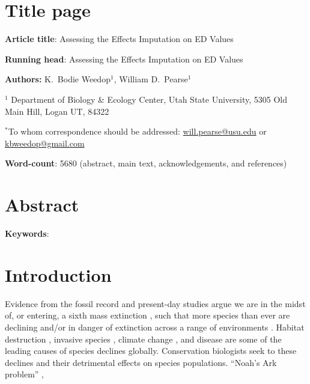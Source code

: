\documentclass[12pt,english]{article}
\begin{document}
\setlength{\parindent}{0pt}
\section*{Title page}

\textbf{Article title}: Assessing the Effects Imputation on ED Values

\textbf{Running head}: Assessing the Effects Imputation on ED Values

\textbf{Authors:} K.\ Bodie Weedop$^{1}$, William D.\ Pearse$^{1}$\

$^1$ Department of Biology \& Ecology Center, Utah State University,
5305 Old Main Hill, Logan UT, 84322

$^*$To whom correspondence should be addressed:
\url{will.pearse@usu.edu} or \url{kbweedop@gmail.com}

\textbf{Word-count}: 5680 (abstract, main text, acknowledgements, and
  references)

\clearpage
\section*{Abstract}


\textbf{Keywords}: 

\clearpage
\section*{Introduction}
Evidence from the fossil record and present-day studies argue we are
in the midst of, or entering, a sixth mass extinction
\autocite{Barnosky2011, Ceballos2015}, such that more species than
ever are declining and/or in danger of extinction across a range of
environments \autocite{Wake2008,Thomas2004}. Habitat destruction
\autocite{Brooks2002}, invasive species \autocite{Molnar2008}, climate
change \autocite{Pounds2006}, and disease \autocite{Lips2006} are some
of the leading causes of species declines globally. Conservation
biologists seek to  these
declines and their detrimental effects on species populations.  ``Noah's Ark
problem'' \autocite{Weitzman1998}, 
\end{document}
